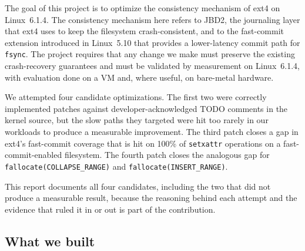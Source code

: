 \documentclass[11pt,a4paper]{article}
\begin{document}
The goal of this project is to optimize the consistency mechanism
of ext4 on Linux~6.1.4. The consistency mechanism here refers to
JBD2, the journaling layer that ext4 uses to keep the filesystem
crash-consistent, and to the fast-commit extension introduced in
Linux~5.10 that provides a lower-latency commit path for
\texttt{fsync}. The project requires that any change we make must
preserve the existing crash-recovery guarantees and must be
validated by measurement on Linux~6.1.4, with evaluation done on a
VM and, where useful, on bare-metal hardware.

We attempted four candidate optimizations. The first two were
correctly implemented patches against developer-acknowledged TODO
comments in the kernel source, but the slow paths they targeted
were hit too rarely in our workloads to produce a measurable
improvement. The third patch closes a gap in ext4's fast-commit
coverage that is hit on 100\% of \texttt{setxattr} operations on a
fast-commit-enabled filesystem. The fourth patch closes the
analogous gap for \texttt{fallocate(COLLAPSE\_RANGE)} and
\texttt{fallocate(INSERT\_RANGE)}.

This report documents all four candidates, including the two that
did not produce a measurable result, because the reasoning behind
each attempt and the evidence that ruled it in or out is part of
the contribution.

\subsection{What we built}
\end{document}
